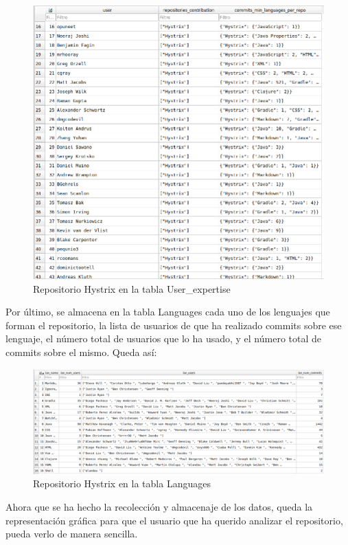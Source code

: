 \documentclass[a4paper, 12pt]{book}
\begin{document}
\begin{figure}[H]
  \centering
  \includegraphics[width=1\textwidth]{img/hystrixuserexpertise.png}
  \caption{Repositorio Hystrix en la tabla User\_expertise}
  \label{figura:hystrixuserexpertise}
\end{figure}

Por último, se almacena en la tabla Languages cada uno de los lenguajes que forman el repositorio, la lista de usuarios de que ha realizado commits sobre ese lenguaje, el número total de usuarios que lo ha usado, y el número total de commits sobre el mismo. Queda así:

\begin{figure}[H]
  \centering
  \includegraphics[width=1\textwidth]{img/hystrixlanguages.png}
  \caption{Repositorio Hystrix en la tabla Languages}
  \label{figura:hystrixlanguages}
\end{figure}

Ahora que se ha hecho la recolección y almacenaje de los datos, queda la representación gráfica para que el usuario que ha querido analizar el repositorio, pueda verlo de manera sencilla.
\end{document}
